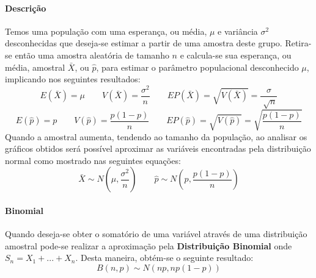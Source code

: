 \documentclass{article}
\begin{document}
        \paragraph{Descrição}Temos uma população com uma esperança, ou média, $\mu$ e variância $\sigma^{2}$ desconhecidas que deseja-se estimar a partir de uma amostra deste grupo. Retira-se então uma amostra aleatória de tamanho $n$ e calcula-se sua esperança, ou média, amostral $\bar{X}$, ou $\hat{p}$, para estimar o parâmetro populacional desconhecido $\mu$, implicando nos seguintes resultados:
            \begin{equation}
                \boxed{
                    E(\bar{X}) = \mu
                }
                \qquad
                \boxed{
                    V(\bar{X}) = \frac{\sigma^{2}}{n}
                }
                \qquad
                \boxed{
                    EP(\bar{X}) = 
                    \sqrt{V(\bar{X})} =
                    \frac{\sigma}{\sqrt[]{n}}
                }
            \end{equation}
            \begin{equation}
                \boxed{
                    E(\hat{p}) = p
                }
                \qquad
                \boxed{
                    V(\hat{p}) = \frac{p(1-p)}{n}
                }
                \qquad
                \boxed{
                    EP(\hat{p}) = 
                    \sqrt{V(\hat{p})} =
                    \sqrt{\frac{p(1-p)}{n}}
                }
            \end{equation}
        Quando a amostral aumenta, tendendo ao tamanho da população, ao analisar os gráficos obtidos será possível aproximar as variáveis encontradas pela distribuição normal como mostrado nas seguintes equações:
            \begin{equation}
                \boxed{
                    \bar{X} \sim N \left(\mu, \frac{\sigma^{2}}{n}\right)
                }
                \qquad
                \boxed{
                    \hat{p} \sim N \left(p, \frac{p(1-p)}{n}\right)
                }
            \end{equation}

        \paragraph{Binomial}Quando deseja-se obter o somatório de uma variável através de uma distribuição amostral pode-se realizar a aproximação pela \textbf{Distribuição Binomial} onde $S_{n} = X_{1} + ... + X_{n}$. Desta maneira, obtém-se o seguinte resultado:
            \begin{equation}
                \boxed{
                    B(n, p) \sim N(np, np(1-p))
                }
            \end{equation}
\end{document}
